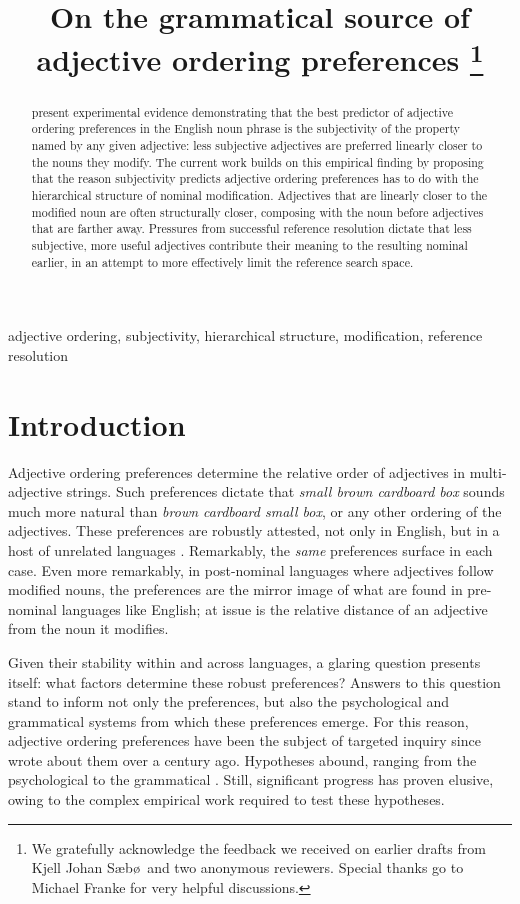 \documentclass{sp}
\title[On the grammatical source of adjective ordering preferences]{On the grammatical source of adjective ordering preferences%
	\thanks{We gratefully acknowledge the feedback we received on earlier drafts from Kjell Johan S\ae b\o\  and two anonymous reviewers. Special thanks go to Michael Franke for very helpful discussions.}}
\author[Scontras, Degen, Goodman]{%
	\spauthor{Gregory Scontras \\ \institute{University of California, Irvine}} \AND
	\spauthor{Judith Degen \\ \institute{Stanford University}} \AND
	\spauthor{Noah D.~Goodman \\ \institute{Stanford University}}}
\begin{document}
\maketitle

\begin{abstract}
	\cite{scontrasetal2017adjectives} present experimental evidence demonstrating that the best predictor of adjective ordering preferences in the English noun phrase is the subjectivity of the property named by any given adjective: less subjective adjectives are preferred linearly closer to the nouns they modify. The current work builds on this empirical finding by proposing that the reason subjectivity predicts adjective ordering preferences has to do with the hierarchical structure of nominal modification. Adjectives that are linearly closer to the modified noun are often structurally closer, composing with the noun before adjectives that are farther away. Pressures from successful reference resolution dictate that less subjective, more useful adjectives contribute their meaning to the resulting nominal earlier, in an attempt to more effectively limit the reference search space.
\end{abstract}

\begin{keywords}
	adjective ordering, subjectivity, hierarchical structure, modification, reference resolution
\end{keywords}

\section{Introduction}

Adjective ordering preferences determine the relative order of adjectives in multi-adjective strings. Such preferences dictate that \emph{small brown cardboard box} sounds much more natural than \emph{brown cardboard small box}, or any other ordering of the adjectives. 
These preferences are robustly attested, not only in English, but in a host of unrelated languages \citep[see, among others,][]{dixon1982}. Remarkably, the \emph{same} preferences surface in each case. Even more remarkably, in post-nominal languages where adjectives follow modified nouns, the preferences are the mirror image of what are found in pre-nominal languages like English; %
at issue is the relative distance of an adjective from the noun it modifies.

Given their stability within and across languages, a glaring question presents itself: what factors determine these robust preferences? Answers to this question stand to inform not only the preferences, but also the psychological and grammatical systems from which these preferences emerge. For this reason, adjective ordering preferences have been the subject of targeted inquiry since \cite{sweet1898} wrote about them over a century ago. Hypotheses abound, ranging from the psychological \citep[e.g.,][]{whorf1945,martin1969} to the grammatical \citep[e.g.,][]{cinque1994,mcnallyboleda2004,truswell2009}. Still, significant progress has proven elusive, owing to the complex empirical work required to test these hypotheses.
\end{document}
